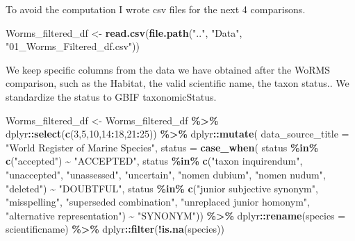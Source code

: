 \documentclass[
]{article}
\newenvironment{Shaded}{\begin{snugshade}}{\end{snugshade}}
\newcommand{\AttributeTok}[1]{\textcolor[rgb]{0.13,0.29,0.53}{#1}}
\newcommand{\DecValTok}[1]{\textcolor[rgb]{0.00,0.00,0.81}{#1}}
\newcommand{\FunctionTok}[1]{\textcolor[rgb]{0.13,0.29,0.53}{\textbf{#1}}}
\newcommand{\NormalTok}[1]{#1}
\newcommand{\OtherTok}[1]{\textcolor[rgb]{0.56,0.35,0.01}{#1}}
\newcommand{\SpecialCharTok}[1]{\textcolor[rgb]{0.81,0.36,0.00}{\textbf{#1}}}
\newcommand{\StringTok}[1]{\textcolor[rgb]{0.31,0.60,0.02}{#1}}
\begin{document}
To avoid the computation I wrote csv files for the next 4 comparisons.

\begin{Shaded}
\begin{Highlighting}[]
\NormalTok{Worms\_filtered\_df }\OtherTok{\textless{}{-}} \FunctionTok{read.csv}\NormalTok{(}\FunctionTok{file.path}\NormalTok{(}\StringTok{".."}\NormalTok{, }\StringTok{"Data"}\NormalTok{, }\StringTok{"01\_Worms\_Filtered\_df.csv"}\NormalTok{)) }
\end{Highlighting}
\end{Shaded}

We keep specific columns from the data we have obtained after the WoRMS
comparison, such as the Habitat, the valid scientific name, the taxon
status.. We standardize the status to GBIF taxonomicStatus.

\begin{Shaded}
\begin{Highlighting}[]
\NormalTok{Worms\_filtered\_df }\OtherTok{\textless{}{-}}\NormalTok{ Worms\_filtered\_df }\SpecialCharTok{\%\textgreater{}\%}
\NormalTok{  dplyr}\SpecialCharTok{::}\FunctionTok{select}\NormalTok{(}\FunctionTok{c}\NormalTok{(}\DecValTok{3}\NormalTok{,}\DecValTok{5}\NormalTok{,}\DecValTok{10}\NormalTok{,}\DecValTok{14}\SpecialCharTok{:}\DecValTok{18}\NormalTok{,}\DecValTok{21}\SpecialCharTok{:}\DecValTok{25}\NormalTok{)) }\SpecialCharTok{\%\textgreater{}\%}
\NormalTok{  dplyr}\SpecialCharTok{::}\FunctionTok{mutate}\NormalTok{(}
    \AttributeTok{data\_source\_title =} \StringTok{"World Register of Marine Species"}\NormalTok{,}
    \AttributeTok{status =} \FunctionTok{case\_when}\NormalTok{(}
\NormalTok{      status }\SpecialCharTok{\%in\%} \FunctionTok{c}\NormalTok{(}\StringTok{"accepted"}\NormalTok{) }\SpecialCharTok{\textasciitilde{}} \StringTok{"ACCEPTED"}\NormalTok{,}
\NormalTok{      status }\SpecialCharTok{\%in\%} \FunctionTok{c}\NormalTok{(}\StringTok{"taxon inquirendum"}\NormalTok{, }\StringTok{"unaccepted"}\NormalTok{, }\StringTok{"unassessed"}\NormalTok{, }\StringTok{"uncertain"}\NormalTok{, }\StringTok{"nomen dubium"}\NormalTok{, }\StringTok{"nomen nudum"}\NormalTok{, }\StringTok{"deleted"}\NormalTok{) }\SpecialCharTok{\textasciitilde{}} \StringTok{"DOUBTFUL"}\NormalTok{,}
\NormalTok{      status }\SpecialCharTok{\%in\%} \FunctionTok{c}\NormalTok{(}\StringTok{"junior subjective synonym"}\NormalTok{, }\StringTok{"misspelling"}\NormalTok{, }\StringTok{"superseded combination"}\NormalTok{, }\StringTok{"unreplaced junior homonym"}\NormalTok{, }\StringTok{"alternative representation"}\NormalTok{) }\SpecialCharTok{\textasciitilde{}} \StringTok{"SYNONYM"}\NormalTok{)) }\SpecialCharTok{\%\textgreater{}\%}
\NormalTok{  dplyr}\SpecialCharTok{::}\FunctionTok{rename}\NormalTok{(}\AttributeTok{species =}\NormalTok{ scientificname) }\SpecialCharTok{\%\textgreater{}\%}
\NormalTok{  dplyr}\SpecialCharTok{::}\FunctionTok{filter}\NormalTok{(}\SpecialCharTok{!}\FunctionTok{is.na}\NormalTok{(species))}
\end{Highlighting}
\end{Shaded}
\end{document}
